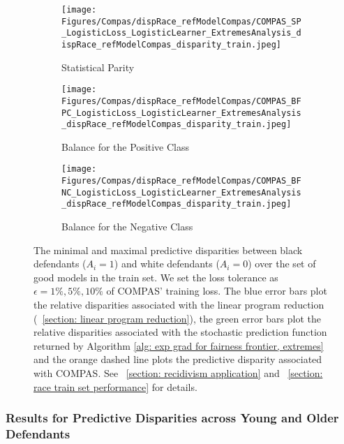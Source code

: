 \documentclass{article}
\begin{document}
\begin{figure}[htbp!]
     \centering
     \begin{subfigure}[b]{0.4\textwidth}
         \centering
         \texttt{[image: Figures/Compas/dispRace\_refModelCompas/COMPAS\_SP\_LogisticLoss\_LogisticLearner\_ExtremesAnalysis\_dispRace\_refModelCompas\_disparity\_train.jpeg]}
         \caption{Statistical Parity}
         \label{fig: Compas Race - ref model compas Train SP}
     \end{subfigure}
     \hfill
     \begin{subfigure}[b]{0.4\textwidth}
         \centering
         \texttt{[image: Figures/Compas/dispRace\_refModelCompas/COMPAS\_BFPC\_LogisticLoss\_LogisticLearner\_ExtremesAnalysis\_dispRace\_refModelCompas\_disparity\_train.jpeg]}
         \caption{Balance for the Positive Class}
         \label{fig: Compas Race - ref model compas Train BFPC}
     \end{subfigure}
     \hfill
     \begin{subfigure}[b]{0.4\textwidth}
         \centering
         \texttt{[image: Figures/Compas/dispRace\_refModelCompas/COMPAS\_BFNC\_LogisticLoss\_LogisticLearner\_ExtremesAnalysis\_dispRace\_refModelCompas\_disparity\_train.jpeg]}
         \caption{Balance for the Negative Class}
         \label{fig: Compas Race - ref model compas Train BFNC}
     \end{subfigure}
    \caption{The minimal and maximal predictive disparities between black defendants ($A_i = 1$) and white defendants ($A_i = 0$) over the set of good models in the train set. We set the loss tolerance as $\epsilon = 1\%, 5\%, 10\%$ of COMPAS' training loss. The blue error bars plot the relative disparities associated with the linear program reduction (\textsection~\ref{section: linear program reduction}), the green error bars plot the relative disparities associated with the stochastic prediction function returned by Algorithm \ref{alg: exp grad for fairness frontier, extremes} and the orange dashed line plots the predictive disparity associated with COMPAS. See \textsection~\ref{section: recidivism application} and \textsection~\ref{section: race train set performance} for details.}
    \label{fig: Compas Race - ref model compas Train Plots}
\end{figure}

\subsubsection{Results for Predictive Disparities across Young and Older Defendants}\label{section: COMPAS age experiments}
\end{document}

